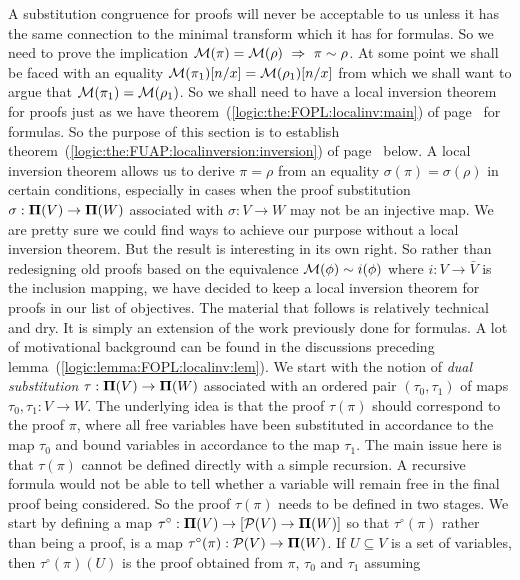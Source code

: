 A substitution congruence for proofs will never be acceptable to us
unless it has the same connection to the minimal transform which it
has for formulas. So we need to prove the implication ${\cal
M}(\pi)={\cal M}(\rho)\ \Rightarrow\ \pi\sim\rho$. At some point we
shall be faced with an equality ${\cal M}(\pi_{1})[n/x]={\cal
M}(\rho_{1})[n/x]$ from which we shall want to argue that ${\cal
M}(\pi_{1})={\cal M}(\rho_{1})$. So we shall need to have a local
inversion theorem for proofs just as we have
theorem~(\ref{logic:the:FOPL:localinv:main}) of
page~\pageref{logic:the:FOPL:localinv:main} for formulas. So the
purpose of this section is to establish
theorem~(\ref{logic:the:FUAP:localinversion:inversion}) of
page~\pageref{logic:the:FUAP:localinversion:inversion} below. A
local inversion theorem allows us to derive $\pi=\rho$ from an
equality $\sigma(\pi)=\sigma(\rho)$ in certain conditions,
especially in cases when the proof substitution $\sigma:\mbox{${\bf\Pi}(V)$}\to{\bf
\Pi}(W)$ associated with $\sigma:V\to W$ may not be an injective
map. We are pretty sure we could find ways to achieve our purpose
without a local inversion theorem. But the result is interesting in
its own right. So rather than redesigning old proofs based on the
equivalence ${\cal M}(\phi)\sim i(\phi)$ where $i:V\to\bar{V}$ is
the inclusion mapping, we have decided to keep a local inversion
theorem for proofs in our list of objectives. The material that
follows is relatively technical and dry. It is simply an extension
of the work previously done for formulas. A lot of motivational
background can be found in the discussions preceding
lemma~(\ref{logic:lemma:FOPL:localinv:lem}). We start with the
notion of {\em dual substitution} $\tau:\mbox{${\bf\Pi}(V)$}\to{\bf\Pi}(W)$
associated with an ordered pair $(\tau_{0},\tau_{1})$ of maps
$\tau_{0},\tau_{1}:V\to W$. The underlying idea is that the proof
$\tau(\pi)$ should correspond to the proof $\pi$, where all free
variables have been substituted in accordance to the map $\tau_{0}$
and bound variables in accordance to the map $\tau_{1}$. The main
issue here is that $\tau(\pi)$ cannot be defined directly with a
simple recursion. A recursive formula would not be able to tell
whether a variable will remain free in the final proof being
considered. So the proof $\tau(\pi)$ needs to be defined in two
stages. We start by defining a map $\tau^{\circ}:\mbox{${\bf\Pi}(V)$}\to[{\cal
P}(V)\to{\bf\Pi}(W)]$ so that $\tau^{\circ}(\pi)$ rather than being
a proof, is a map $\tau^{\circ}(\pi):{\cal P}(V)\to{\bf\Pi}(W)$. If
$U\subseteq V$ is a set of variables, then $\tau^{\circ}(\pi)(U)$ is
the proof obtained from $\pi$, $\tau_{0}$ and $\tau_{1}$ assuming
